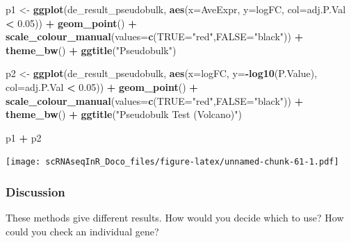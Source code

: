\documentclass[
]{book}
\newenvironment{Shaded}{\begin{snugshade}}{\end{snugshade}}
\newcommand{\AttributeTok}[1]{\textcolor[rgb]{0.13,0.29,0.53}{#1}}
\newcommand{\FloatTok}[1]{\textcolor[rgb]{0.00,0.00,0.81}{#1}}
\newcommand{\FunctionTok}[1]{\textcolor[rgb]{0.13,0.29,0.53}{\textbf{#1}}}
\newcommand{\NormalTok}[1]{#1}
\newcommand{\OtherTok}[1]{\textcolor[rgb]{0.56,0.35,0.01}{#1}}
\newcommand{\SpecialCharTok}[1]{\textcolor[rgb]{0.81,0.36,0.00}{\textbf{#1}}}
\newcommand{\StringTok}[1]{\textcolor[rgb]{0.31,0.60,0.02}{#1}}
\begin{document}
\begin{Shaded}
\begin{Highlighting}[]
\NormalTok{p1 }\OtherTok{\textless{}{-}} \FunctionTok{ggplot}\NormalTok{(de\_result\_pseudobulk, }\FunctionTok{aes}\NormalTok{(}\AttributeTok{x=}\NormalTok{AveExpr, }\AttributeTok{y=}\NormalTok{logFC, }\AttributeTok{col=}\NormalTok{adj.P.Val }\SpecialCharTok{\textless{}} \FloatTok{0.05}\NormalTok{)) }\SpecialCharTok{+}
  \FunctionTok{geom\_point}\NormalTok{() }\SpecialCharTok{+}
  \FunctionTok{scale\_colour\_manual}\NormalTok{(}\AttributeTok{values=}\FunctionTok{c}\NormalTok{(}\StringTok{\textquotesingle{}TRUE\textquotesingle{}}\OtherTok{=}\StringTok{"red"}\NormalTok{,}\StringTok{\textquotesingle{}FALSE\textquotesingle{}}\OtherTok{=}\StringTok{"black"}\NormalTok{)) }\SpecialCharTok{+} 
  \FunctionTok{theme\_bw}\NormalTok{() }\SpecialCharTok{+}
  \FunctionTok{ggtitle}\NormalTok{(}\StringTok{"Pseudobulk"}\NormalTok{)}


\NormalTok{p2 }\OtherTok{\textless{}{-}} \FunctionTok{ggplot}\NormalTok{(de\_result\_pseudobulk, }\FunctionTok{aes}\NormalTok{(}\AttributeTok{x=}\NormalTok{logFC, }\AttributeTok{y=}\SpecialCharTok{{-}}\FunctionTok{log10}\NormalTok{(P.Value), }\AttributeTok{col=}\NormalTok{adj.P.Val }\SpecialCharTok{\textless{}} \FloatTok{0.05}\NormalTok{)) }\SpecialCharTok{+}
  \FunctionTok{geom\_point}\NormalTok{() }\SpecialCharTok{+}
  \FunctionTok{scale\_colour\_manual}\NormalTok{(}\AttributeTok{values=}\FunctionTok{c}\NormalTok{(}\StringTok{\textquotesingle{}TRUE\textquotesingle{}}\OtherTok{=}\StringTok{"red"}\NormalTok{,}\StringTok{\textquotesingle{}FALSE\textquotesingle{}}\OtherTok{=}\StringTok{"black"}\NormalTok{)) }\SpecialCharTok{+} 
  \FunctionTok{theme\_bw}\NormalTok{() }\SpecialCharTok{+}
  \FunctionTok{ggtitle}\NormalTok{(}\StringTok{"Pseudobulk Test (Volcano)"}\NormalTok{)}

\NormalTok{p1 }\SpecialCharTok{+}\NormalTok{ p2}
\end{Highlighting}
\end{Shaded}

\texttt{[image: scRNAseqInR\_Doco\_files/figure-latex/unnamed-chunk-61-1.pdf]}

\hypertarget{discussion}{%
\subsubsection*{Discussion}\label{discussion}}

These methods give different results. How would you decide which to use? How could you check an individual gene?
\end{document}
